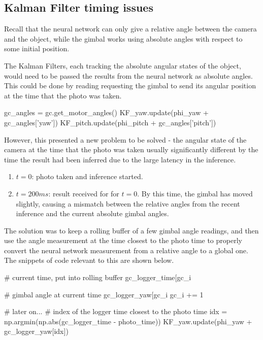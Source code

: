 \subsection{Kalman Filter timing issues}
Recall that the neural network can only give a relative angle between the camera and the object, while the gimbal works using absolute angles with respect to some initial position.

The Kalman Filters, each tracking the absolute angular states of the object, would need to be passed the results from the neural network as absolute angles. This could be done by reading requesting the gimbal to send its angular position at the time that the photo was taken. \\

\begin{python}
gc_angles = gc.get_motor_angles()
KF_yaw.update(phi_yaw + gc_angles['yaw'])
KF_pitch.update(phi_pitch + gc_angles['pitch'])
\end{python}

However, this presented a new problem to be solved - the angular state of the camera at the time that the photo was taken usually significantly different by the time the result had been inferred due to the large latency in the inference.

\begin{enumerate}
\item $t = 0$: photo taken and inference started.
\item $t = 200ms$: result received for for $t=0$. By this time, the gimbal has moved slightly, causing a mismatch between the relative angles from the recent inference and the current absolute gimbal angles.
\end{enumerate}

The solution was to keep a rolling buffer of a few gimbal angle readings, and then use the angle measurement at the time closest to the photo time to properly convert the neural network measurement from a relative angle to a global one. The snippets of code relevant to this are shown below. \\

\begin{python}
# current time, put into rolling buffer
gc_logger_time[gc_i %

# gimbal angle at current time
gc_logger_yaw[gc_i %
gc_i += 1

# later on...
# index of the logger time closest to the photo time
idx = np.argmin(np.abs(gc_logger_time - photo_time))
KF_yaw.update(phi_yaw + gc_logger_yaw[idx])
\end{python}

